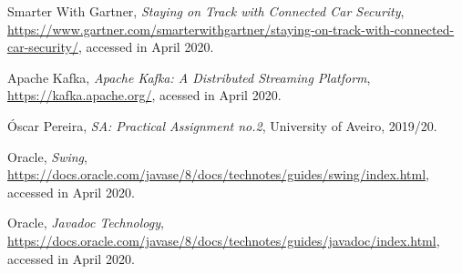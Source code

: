 \documentclass[12pt]{article}
\begin{document}
\begin{thebibliography}{9} %
  

    Smarter With Gartner,
    \textit{Staying on Track with Connected Car Security},
    \url{https://www.gartner.com/smarterwithgartner/staying-on-track-with-connected-car-security/},
    accessed in April 2020.

    Apache Kafka,
    \textit{Apache Kafka: A Distributed Streaming Platform},
    \url{https://kafka.apache.org/},
    acessed in April 2020.

    Óscar Pereira,
    \textit{SA: Practical Assignment no.2},
    University of Aveiro,
    2019/20.

    Oracle,
    \textit{Swing},
    \url{https://docs.oracle.com/javase/8/docs/technotes/guides/swing/index.html},
    accessed in April 2020.

    Oracle,
    \textit{Javadoc Technology},
    \url{https://docs.oracle.com/javase/8/docs/technotes/guides/javadoc/index.html},
    accessed in April 2020.


    
 

\end{thebibliography}

\clearpage
\end{document}
